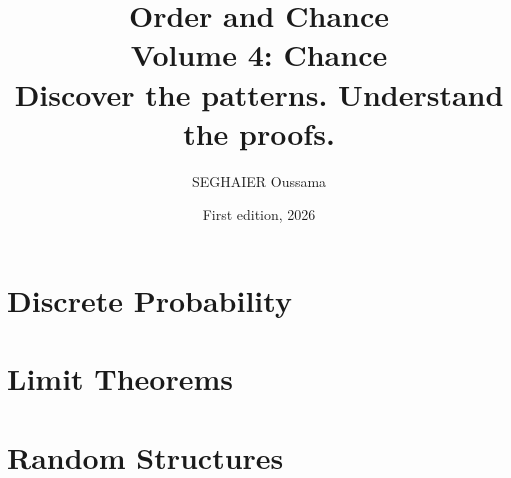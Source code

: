 \documentclass[11pt,openany]{book}
\title{\Huge\textbf{Order and Chance}\\[0.4em]\LARGE Volume 4: Chance\\[0.6em]
\Large Discover the patterns. Understand the proofs.}
\author{SEGHAIER Oussama}
\date{First edition, 2026}
\begin{document}
\frontmatter
\makecover
\maketitle

\tableofcontents

\mainmatter

\part{Discrete Probability}




\part{Limit Theorems}


\part{Random Structures}








\appendix


\end{document}
